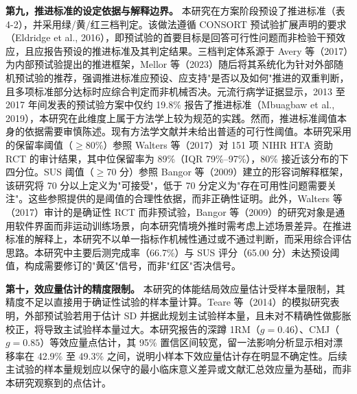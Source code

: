 \documentclass[UTF8,zihao=-4,twoside,openany]{ctexbook}
\begin{document}
\textbf{第九，推进标准的设定依据与解释边界。} 本研究在方案阶段预设了推进标准（表 4-2），并采用绿/黄/红三档判定。该做法遵循 CONSORT 预试验扩展声明的要求（Eldridge et al., 2016），即预试验的首要目标是回答可行性问题而非检验干预效应，且应报告预设的推进标准及其判定结果。三档判定体系源于 Avery 等（2017）为内部预试验提出的推进框架，Mellor 等（2023）随后将其系统化为针对外部随机预试验的推荐，强调推进标准应预设、应支持"是否以及如何"推进的双重判断，且多项标准部分达标时应综合判定而非机械否决。元流行病学证据显示，2013 至 2017 年间发表的预试验方案中仅约 19.8\% 报告了推进标准（Mbuagbaw et al., 2019），本研究在此维度上属于方法学上较为规范的实践。然而，推进标准阈值本身的依据需要审慎陈述。现有方法学文献并未给出普适的可行性阈值。本研究采用的保留率阈值（$\ge$80\%）参照 Walters 等（2017）对 151 项 NIHR HTA 资助 RCT 的审计结果，其中位保留率为 89\%（IQR 79\%--97\%），80\% 接近该分布的下四分位。SUS 阈值（$\ge$70 分）参照 Bangor 等（2009）建立的形容词解释框架，该研究将 70 分以上定义为"可接受"，低于 70 分定义为"存在可用性问题需要关注"。这些参照提供的是阈值的合理性依据，而非正确性证明。此外，Walters 等（2017）审计的是确证性 RCT 而非预试验，Bangor 等（2009）的研究对象是通用软件界面而非运动训练场景，向本研究情境外推时需考虑上述场景差异。在推进标准的解释上，本研究不以单一指标作机械性通过或不通过判断，而采用综合评估思路。本研究中主要后测完成率（66.7\%）与 SUS 评分（65.00 分）未达预设阈值，构成需要修订的"黄区"信号，而非"红区"否决信号。

\textbf{第十，效应量估计的精度限制。} 本研究的体能结局效应量估计受样本量限制，其精度不足以直接用于确证性试验的样本量计算。Teare 等（2014）的模拟研究表明，外部预试验若用于估计 SD 并据此规划主试验样本量，且未对不精确性做膨胀校正，将导致主试验样本量过大。本研究报告的深蹲 1RM（$g=0.46$）、CMJ（$g=0.85$）等效应量点估计，其 95\% 置信区间较宽，留一法影响分析显示相对漂移率在 42.9\% 至 49.3\% 之间，说明小样本下效应量估计存在明显不确定性。后续主试验的样本量规划应以保守的最小临床意义差异或文献汇总效应量为基础，而非本研究观察到的点估计。
\end{document}
